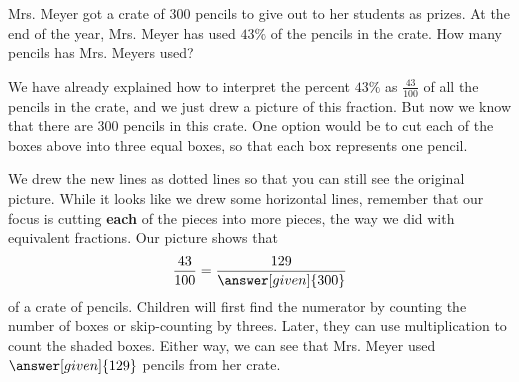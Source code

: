 \documentclass{ximera}
\begin{document}
\begin{question}
Mrs. Meyer got a crate of $300$ pencils to give out to her students as prizes. At the end of the year, Mrs. Meyer has used $43\%$ of the pencils in the crate. How many pencils has Mrs. Meyers used?

\begin{explanation}
We have already explained how to interpret the percent $43\%$ as $\frac{43}{100}$ of all the pencils in the crate, and we just drew a picture of this fraction. But now we know that there are $300$ pencils in this crate. One option would be to cut each of the boxes above into three equal boxes, so that each box represents one pencil.

\begin{image}
\end{image}
We drew the new lines as dotted lines so that you can still see the original picture. While it looks like we drew some horizontal lines, remember that our focus is cutting {\bf each} of the pieces into more pieces, the way we did with equivalent fractions.  Our picture shows that 
\[
\frac{43}{100} = \frac{129}{\answer[given]{300}}
\]
of a crate of pencils. Children will first find the numerator by counting the number of boxes or skip-counting by threes. Later, they can use multiplication to count the shaded boxes. Either way, we can see that Mrs. Meyer used $\answer[given]{129}$ pencils from her crate.

%
%


\end{explanation}
\end{question}
\end{document}
